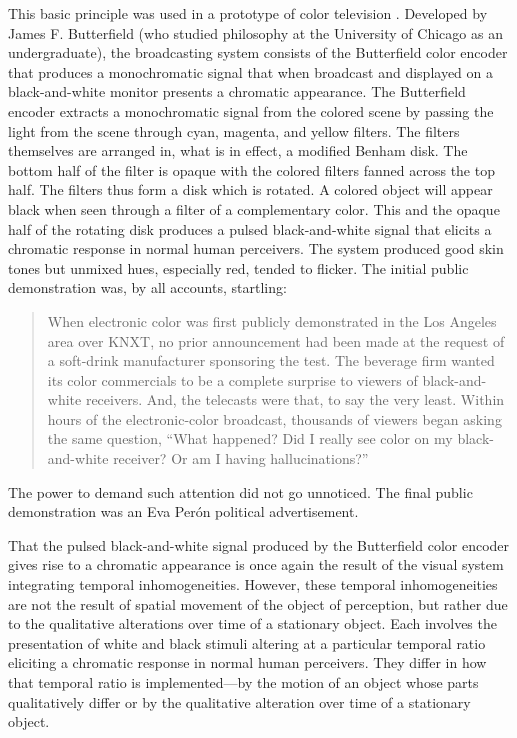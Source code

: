 This basic principle was used in a prototype of color television \citep[]{Butterfield:1968uq,Butterfield:1970kx}. Developed by James F. Butterfield (who studied philosophy at the University of Chicago as an undergraduate), the broadcasting system consists of the Butterfield color encoder that produces a monochromatic signal that when broadcast and displayed on a black-and-white monitor presents a chromatic appearance. The Butterfield encoder extracts a monochromatic signal from the colored scene by passing the light from the scene through cyan, magenta, and yellow filters. The filters themselves are arranged in, what is in effect, a modified Benham disk. The bottom half of the filter is opaque with the colored filters fanned across the top half. The filters thus form a disk which is rotated. A colored object will appear black when seen through a filter of a complementary color. This and the opaque half of the rotating disk produces a pulsed black-and-white signal that elicits a chromatic response in normal human perceivers. The system produced good skin tones but unmixed hues, especially red, tended to flicker. The initial public demonstration was, by all accounts, startling:
\begin{quote}
    When electronic color was first publicly demonstrated in the Los Angeles area over KNXT, no prior announcement had been made at the request of a soft-drink manufacturer sponsoring the test. The beverage firm wanted its color commercials to be a complete surprise to viewers of black-and-white receivers. And, the telecasts were that, to say the very least. Within hours of the electronic-color broadcast, thousands of viewers began asking the same question, ``What happened? Did I really see color on my black-and-white receiver? Or am I having hallucinations?'' \citep[]{Griffin:1968fk}
\end{quote}
The power to demand such attention did not go unnoticed. The final public demonstration was an Eva Per\'{o}n political advertisement.

That the pulsed black-and-white signal produced by the Butterfield color encoder gives rise to a chromatic appearance is once again the result of the visual system integrating temporal inhomogeneities. However, these temporal inhomogeneities are not the result of spatial movement of the object of perception, but rather due to the qualitative alterations over time of a stationary object. Each involves the presentation of white and black stimuli altering at a particular temporal ratio eliciting a chromatic response in normal human perceivers. They differ in how that temporal ratio is implemented---by the motion of an object whose parts qualitatively differ or by the qualitative alteration over time of a stationary object. 

